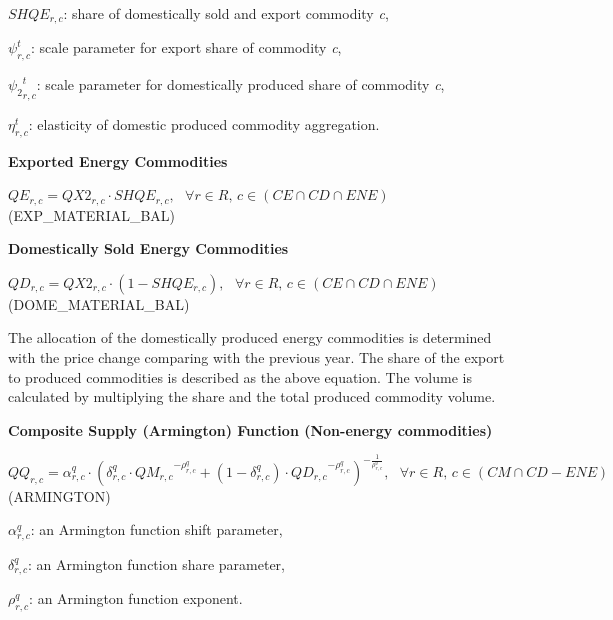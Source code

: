 \documentclass[10pt,a4paper,titlepage,dvipdfmx]{book}
\begin{document}
\begin{flushleft}
$SHQE_{r,c}$: share of domestically sold and export commodity \textit{c},

$\psi _{r,c}^{t}$: scale parameter for export share of commodity \textit{c}, 

${\psi _{2}}_{r,c}^{t}$: scale parameter for domestically produced share of commodity \textit{c}, 

$\eta _{r,c}^{t}$: elasticity of domestic produced commodity aggregation.
\end{flushleft}

\begin{flushleft}\textbf{Exported Energy Commodities}\end{flushleft}


\begin{center}$QE_{r,c}=QX2_{r,c}\cdot SHQE_{r,c},\,\,\,\,\forall r\in R,\,c\in \left(CE\cap CD\cap ENE\right)$ (EXP\_MATERIAL\_BAL)
\end{center}

\begin{flushleft}\textbf{Domestically Sold Energy Commodities}\end{flushleft}


\begin{center}$QD_{r,c}=QX2_{r,c}\cdot \left(1-SHQE_{r,c}\right),\,\,\,\,\forall r\in R,\,c\in \left(CE\cap CD\cap ENE\right)$ (DOME\_MATERIAL\_BAL)
\end{center}

The allocation of the domestically produced energy commodities is determined with the price change comparing with the previous year. The share of the export to produced commodities is described as the above equation. The volume is calculated by multiplying the share and the total produced commodity volume.

\begin{flushleft}\textbf{Composite Supply (Armington) Function (Non-energy commodities)}\end{flushleft}


\begin{center}$QQ_{r,c}=\alpha _{r,c}^{q}\cdot \left(\delta _{r,c}^{q}\cdot Q{M_{r,c}}^{-\rho _{r,c}^{q}}+\left(1-\delta _{r,c}^{q}\right)\cdot Q{D_{r,c}}^{-\rho _{r,c}^{q}}\right)^{-\frac{1}{\rho _{r,c}^{q}}},\,\,\,\,\forall r\in R,\,c\in \left(CM\cap CD-ENE\right)$ (ARMINGTON)
\end{center}

\begin{flushleft}
$\alpha _{r,c}^{q}$: an Armington function shift parameter,

$\delta _{r,c}^{q}$: an Armington function share parameter,

$\rho _{r,c}^{q}$: an Armington function exponent.
\end{flushleft}
\end{document}
